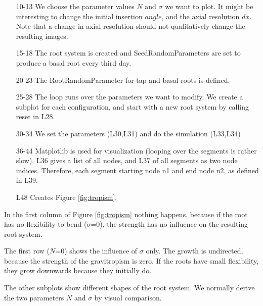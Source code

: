 \begin{itemize}
\item[10-13] We choose the parameter values $N$ and $\sigma$ we want to plot. It might be interesting to change the initial insertion $angle$, and the axial resolution $dx$. Note that a change in axial resolution should not qualitatively change the resulting images.

\item[15-18] The root system is created and SeedRandomParameters are set to produce a basal root every third day. 

\item[20-23] The RootRandomParameter for tap and basal roots is defined.

\item[25-28] The loop runs over the parameters we want to modify. We create a subplot for each configuration, and start with a new root system by calling reset in L28.

\item[30-34] We set the parameters (L30,L31) and do the simulation (L33,L34)

\item[36-44] Matplotlib is used for visualization (looping over the segments is rather slow). L36 gives a list of all nodes, and L37 of all segments as two node indices. Therefore, each segment starting node n1 and end node n2, as defined in L39.

\item[L48] Creates Figure \ref{fig:tropism}.
\end{itemize}

In the first column of Figure \ref{fig:tropism} nothing happens, because if the root has no flexibility to bend ($\sigma$=0), the strength has no influence on the resulting root system. 

The first row ($N$=0) shows the influence of $\sigma$ only. The growth is undirected, because the strength of the gravitropism is zero. If the roots have small flexibility, they grow downwards because they initially do. 

The other subplots show different shapes of the root system. We normally derive the two parameters $N$ and $\sigma$ by visual comparison.  

